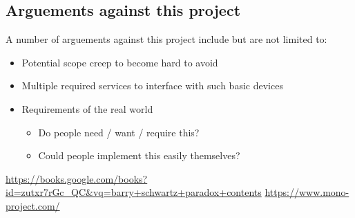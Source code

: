 \documentclass{article}
\begin{document}
            \subsection{Arguements against this project}
            A number of arguements against this project include but are not limited to:
            \begin{itemize}
                \item Potential scope creep to become hard to avoid
                \item Multiple required services to interface with such basic devices
                \item Requirements of the real world 
                \begin{itemize}
                    \item Do people need / want / require this?
                    \item Could people implement this easily themselves?
                \end{itemize}
            \end{itemize}

    \begin{thebibliography}
        \raggedright
            \url{https://books.google.com/books?id=zutxr7rGc_QC&vq=barry+schwartz+paradox+contents}
            \url{https://www.mono-project.com/}
    \end{thebibliography}

    
\end{document}
